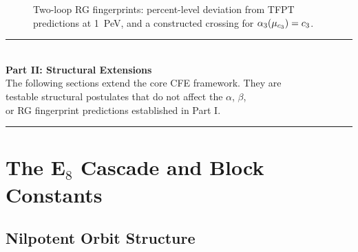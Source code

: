 \begin{figure}[H]
\centering
{}
\caption{Two-loop RG fingerprints: percent-level deviation from TFPT predictions at 1~PeV, and a constructed crossing for $\alpha_3(\mu_{c_3})=c_3$.}
\label{fig:twoloop}
\end{figure}

\vspace{1em}
\begin{center}
\rule{0.8\textwidth}{0.5pt}\\[0.5em]
{\Large\bfseries Part II: Structural Extensions}\\[0.3em]
{\small The following sections extend the core CFE framework. They are \\
testable structural postulates that do not affect the $\alpha$, $\beta$, \\
or RG fingerprint predictions established in Part I.}\\[0.5em]
\rule{0.8\textwidth}{0.5pt}
\end{center}
\vspace{1em}

\section{The E$_8$ Cascade and Block Constants}

\subsection{Nilpotent Orbit Structure}

